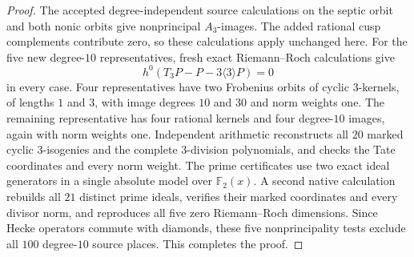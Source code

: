 \begin{proof}
The accepted degree-independent source calculations on the
septic orbit and both nonic orbits give nonprincipal $A_3$-images.
The added rational cusp complements contribute zero, so these
calculations apply unchanged here.
For the five new degree-$10$ representatives, fresh exact
Riemann--Roch calculations give
\[
 h^0(T_3P-P-3\langle3\rangle P)=0
\]
in every case.
Four representatives have two Frobenius orbits of cyclic
$3$-kernels, of lengths $1$ and $3$, with image degrees $10$ and
$30$ and norm weights one.
The remaining representative has four rational kernels and four
degree-$10$ images, again with norm weights one.
Independent arithmetic reconstructs all $20$ marked cyclic
$3$-isogenies and the complete $3$-division polynomials, and checks
the Tate coordinates and every norm weight.
The prime certificates use two exact ideal generators in a
single absolute model over $\mathbb F_2(x)$.
A second native calculation rebuilds all $21$ distinct prime
ideals, verifies their marked coordinates and every divisor norm,
and reproduces all five zero Riemann--Roch dimensions.
Since Hecke operators commute with diamonds, these five
nonprincipality tests exclude all $100$ degree-$10$ source
places. This completes the proof.
\end{proof}
